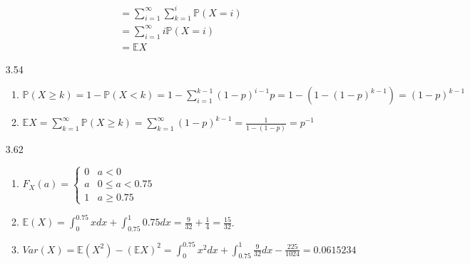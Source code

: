 \documentclass[12pt, letterpaper]{article}
\newcommand{\Pro}{\mathbb{P}}
\begin{document}
\begin{enumerate}
\begin{align*}
		&= \sum_{i=1}^\infty \sum_{k=1}^i \Pro(X=i)\\
		&= \sum_{i=1}^\infty i\Pro(X=i)\\
		&= \mathbb{E}X
	\end{align*}
	\item[3.54]
	\begin{enumerate}
		\item  $\Pro(X \geq k) = 1 - \Pro(X < k) = 1 - \sum_{i=1}^{k-1} (1-p)^{i-1}p = 1 - (1-(1- p)^{k-1}) = (1-p)^{k-1} $
		\item $\mathbb{E}X = \sum_{k=1}^\infty \Pro(X \geq k) = \sum_{k=1}^\infty (1-p)^{k-1} = \frac{1}{1-(1-p)} = p^{-1}$
\end{enumerate}
	\item[3.62] 
	\begin{enumerate}
		\item $F_X(a) = \begin{cases} 0 & a < 0 \\a & 0 \leq  a < 0.75\\ 1 & a \geq 0.75\end{cases}$
		\item $\mathbb{E}(X) = \int_0^{0.75} xdx + \int_{0.75}^1 0.75 dx = \frac{9}{32} + \frac{1}{4} = \frac{15}{32}$.
		\item $Var(X) = \mathbb{E}(X^2) - (\mathbb{E}X)^2 = \int_0^{0.75} x^2dx + \int_{0.75}^1 \frac{9}{32} dx - \frac{225}{1024} = 0.0615234$
	\end{enumerate}		 
\end{enumerate}
\end{document}
